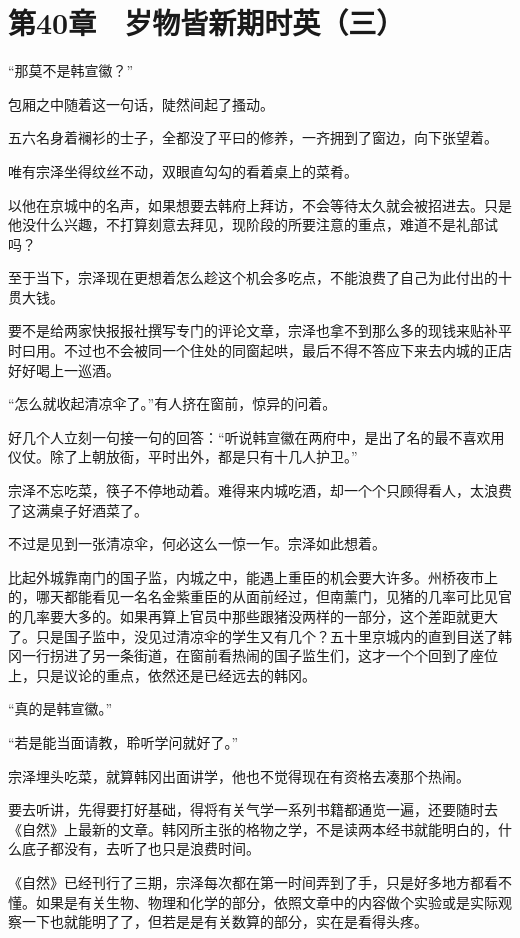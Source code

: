 \section{第40章　岁物皆新期时英（三）}

“那莫不是韩宣徽？”

包厢之中随着这一句话，陡然间起了搔动。

五六名身着襕衫的士子，全都没了平曰的修养，一齐拥到了窗边，向下张望着。

唯有宗泽坐得纹丝不动，双眼直勾勾的看着桌上的菜肴。

以他在京城中的名声，如果想要去韩府上拜访，不会等待太久就会被招进去。只是他没什么兴趣，不打算刻意去拜见，现阶段的所要注意的重点，难道不是礼部试吗？

至于当下，宗泽现在更想着怎么趁这个机会多吃点，不能浪费了自己为此付出的十贯大钱。

要不是给两家快报报社撰写专门的评论文章，宗泽也拿不到那么多的现钱来贴补平时曰用。不过也不会被同一个住处的同窗起哄，最后不得不答应下来去内城的正店好好喝上一巡酒。

“怎么就收起清凉伞了。”有人挤在窗前，惊异的问着。

好几个人立刻一句接一句的回答：“听说韩宣徽在两府中，是出了名的最不喜欢用仪仗。除了上朝放衙，平时出外，都是只有十几人护卫。”

宗泽不忘吃菜，筷子不停地动着。难得来内城吃酒，却一个个只顾得看人，太浪费了这满桌子好酒菜了。

不过是见到一张清凉伞，何必这么一惊一乍。宗泽如此想着。

比起外城靠南门的国子监，内城之中，能遇上重臣的机会要大许多。州桥夜市上的，哪天都能看见一名名金紫重臣的从面前经过，但南薰门，见猪的几率可比见官的几率要大多的。如果再算上官员中那些跟猪没两样的一部分，这个差距就更大了。只是国子监中，没见过清凉伞的学生又有几个？五十里京城内的直到目送了韩冈一行拐进了另一条街道，在窗前看热闹的国子监生们，这才一个个回到了座位上，只是议论的重点，依然还是已经远去的韩冈。

“真的是韩宣徽。”

“若是能当面请教，聆听学问就好了。”

宗泽埋头吃菜，就算韩冈出面讲学，他也不觉得现在有资格去凑那个热闹。

要去听讲，先得要打好基础，得将有关气学一系列书籍都通览一遍，还要随时去《自然》上最新的文章。韩冈所主张的格物之学，不是读两本经书就能明白的，什么底子都没有，去听了也只是浪费时间。

《自然》已经刊行了三期，宗泽每次都在第一时间弄到了手，只是好多地方都看不懂。如果是有关生物、物理和化学的部分，依照文章中的内容做个实验或是实际观察一下也就能明了了，但若是是有关数算的部分，实在是看得头疼。

